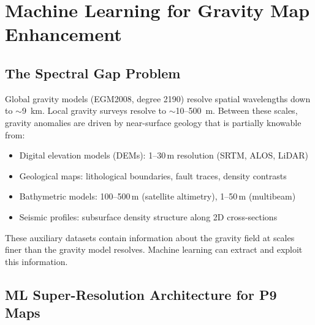 \documentclass[11pt]{article}
\theoremstyle{definition}
\theoremstyle{remark}
\begin{document}
\section{Machine Learning for Gravity Map Enhancement}
\label{sec:ml-gravity}

\subsection{The Spectral Gap Problem}

Global gravity models (EGM2008, degree 2190) resolve spatial wavelengths
down to $\sim$9~km. Local gravity surveys resolve to $\sim$10--500~m.
Between these scales, gravity anomalies are driven by near-surface
geology that is partially knowable from:
\begin{itemize}[nosep]
\item Digital elevation models (DEMs): 1--30\,m resolution (SRTM, ALOS, LiDAR)
\item Geological maps: lithological boundaries, fault traces, density contrasts
\item Bathymetric models: 100--500\,m (satellite altimetry), 1--50\,m (multibeam)
\item Seismic profiles: subsurface density structure along 2D cross-sections
\end{itemize}

These auxiliary datasets contain information about the gravity field at
scales finer than the gravity model resolves. Machine learning can extract
and exploit this information.

\subsection{ML Super-Resolution Architecture for P9 Maps}
\end{document}
